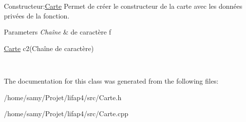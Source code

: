 Constructeur\+:\hyperlink{classCarte}{Carte} Permet de créer le constructeur de la carte avec les données privées de la fonction. 


\begin{DoxyParams}{Parameters}
{\em Chaîne} & de caractère f 
\begin{DoxyCode}
\hyperlink{classCarte}{Carte} c2(Chaîne de caractère)
\end{DoxyCode}
 \\
\hline
\end{DoxyParams}


The documentation for this class was generated from the following files\+:\begin{DoxyCompactItemize}
\item 
/home/samy/\+Projet/lifap4/src/Carte.\+h\item 
/home/samy/\+Projet/lifap4/src/Carte.\+cpp\end{DoxyCompactItemize}
